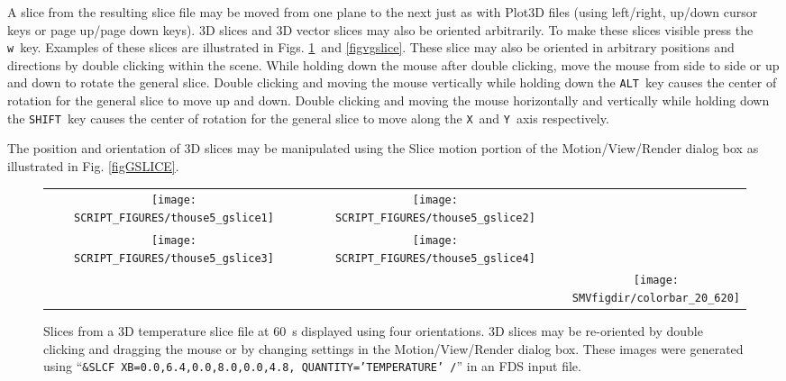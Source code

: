 \documentclass[11pt,twoside]{book}
\newcommand{\figheightAbar}{2.2in}
\begin{document}
A slice from the resulting slice file
may be moved from one plane to the next just as with Plot3D
files (using left/right, up/down cursor keys or page up/page down
keys).  3D slices and 3D vector slices may also be oriented arbitrarily.
To make these slices visible press the {\tt w}\ key.  Examples of
these slices are illustrated in Figs. \ref{figgslice}\ and \ref{figvgslice}.
These slice may also be oriented in arbitrary positions and directions by
double clicking within the scene.  While holding down the mouse after double clicking,
move the mouse from
side to side or up and down to rotate the general slice.  Double clicking and moving
the mouse vertically while holding down the {\tt ALT}\
key causes the center of rotation for the general slice to move up and down.
Double clicking and moving the mouse horizontally and vertically while holding down
the {\tt SHIFT}\ key causes the center of rotation for the general slice to move along
the {\tt X}\ and {\tt Y}\ axis respectively.

The position and orientation of 3D slices may be manipulated using the Slice motion
portion of the Motion/View/Render dialog box as illustrated
in Fig. \ref{figGSLICE}.

\begin{figure}[bph]
\begin{center}
\begin{tabular}{ccc}
\texttt{[image: SCRIPT\_FIGURES/thouse5\_gslice1]}&
\texttt{[image: SCRIPT\_FIGURES/thouse5\_gslice2]}\\
\texttt{[image: SCRIPT\_FIGURES/thouse5\_gslice3]}&
\texttt{[image: SCRIPT\_FIGURES/thouse5\_gslice4]}&\\
&&\raisebox{0.0ex}[0pt]{\texttt{[image: \\SMVfigdir/colorbar\_20\_620]}}\\
\end{tabular}
\caption [General oriented temperature slices.]
{
Slices from a 3D temperature slice file at 60~s displayed using four orientations.
3D slices may be re-oriented by double clicking and dragging the mouse
or by changing settings in the Motion/View/Render dialog box.
These images were generated using
``{\tt \&SLCF XB=0.0,6.4,0.0,8.0,0.0,4.8, QUANTITY='TEMPERATURE' /}'' in an FDS
input file. }
\label{figgslice}%
\end{center}
\end{figure}
\end{document}
